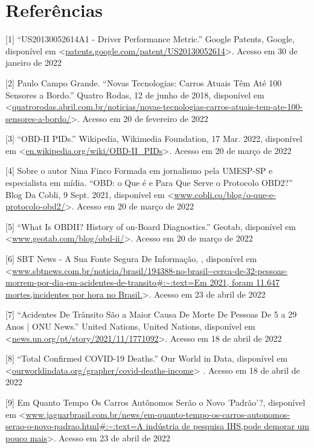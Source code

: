 \chapter{Referências}


[1] “US20130052614A1 - Driver Performance Metric.” Google Patents, Google, disponível em <\url{patents.google.com/patent/US20130052614}>. Acesso em 30 de janeiro de 2022

[2] Paulo Campo Grande. “Novas Tecnologias: Carros Atuais Têm Até 100 Sensores a Bordo.” Quatro Rodas, 12 de junho de 2018, disponível em <\url{quatrorodas.abril.com.br/noticias/novas-tecnologias-carros-atuais-tem-ate-100-sensores-a-bordo/}>. Acesso em 20 de fevereiro de 2022

[3] “OBD-II PIDs.” Wikipedia, Wikimedia Foundation, 17 Mar. 2022, disponível em <\url{en.wikipedia.org/wiki/OBD-II_PIDs}>. Acesso em 20 de março de 2022

[4] Sobre o autor Nina Finco Formada em jornalismo pela UMESP-SP e especialista em mídia. “OBD: o Que é e Para Que Serve o Protocolo OBD2?” Blog Da Cobli, 9 Sept. 2021, disponível em <\url{www.cobli.co/blog/o-que-e-protocolo-obd2/}>. Acesso em 20 de março de 2022

[5] “What Is OBDII? History of on-Board Diagnostics.” Geotab, disponível em <\url{www.geotab.com/blog/obd-ii/}>. Acesso em 20 de março de 2022

[6] SBT News - A Sua Fonte Segura De Informação, , disponível em <\url{www.sbtnews.com.br/noticia/brasil/194388-no-brasil--cerca-de-32-pessoas-morrem-por-dia-em-acidentes-de-transito#:~:text=Em 2021, foram 11.647 mortes,incidentes por hora no Brasil.}>. Acesso em 23 de abril de 2022

[7] “Acidentes De Trânsito São a Maior Causa De Morte De Pessoas De 5 a 29 Anos  | ONU News.” United Nations, United Nations, disponível em <\url{news.un.org/pt/story/2021/11/1771092}>. Acesso em 18 de abril de 2022

[8] “Total Confirmed COVID-19 Deaths.” Our World in Data, disponível em <\url{ourworldindata.org/grapher/covid-deaths-income}>
. Acesso em 18 de abril de 2022

[9] Em Quanto Tempo Os Carros Autônomos Serão o Novo 'Padrão'?, disponível em <\url{www.jaguarbrasil.com.br/news/em-quanto-tempo-os-carros-autonomos-serao-o-novo-padrao.html#:~:text=A indústria de pesquisa IHS,pode demorar um pouco mais}>. Acesso em 23 de abril de 2022


